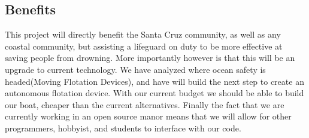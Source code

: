 \documentclass[11pt]{article}
\begin{document}
\subsection*{Benefits}

This project will directly benefit the Santa Cruz community, as well as any coastal community, but assisting a lifeguard on duty to be more effective at saving people from drowning. More importantly however is that this will be an upgrade to current technology. We have analyzed where ocean safety is headed(Moving Flotation Devices), and have will build the next step to create an autonomous flotation device. With our current budget we should be able to build our boat, cheaper than the current alternatives. Finally the fact that we are currently working in an open source manor means that we will allow for other programmers, hobbyist, and students to interface with our code. 
\end{document}
